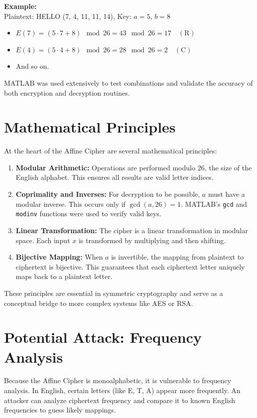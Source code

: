 \documentclass[12pt]{article}
\begin{document}
\textbf{Example:} \\
Plaintext: HELLO (7, 4, 11, 11, 14), Key: \( a = 5 \), \( b = 8 \)
\begin{itemize}
    \item \( E(7) = (5 \cdot 7 + 8) \mod 26 = 43 \mod 26 = 17 \quad (\text{R}) \)
    \item \( E(4) = (5 \cdot 4 + 8) \mod 26 = 28 \mod 26 = 2 \quad (\text{C}) \)
    \item And so on.
\end{itemize}
MATLAB was used extensively to test combinations and validate the accuracy of both encryption and decryption routines.

\section*{Mathematical Principles}
At the heart of the Affine Cipher are several mathematical principles:
\begin{enumerate}
    \item \textbf{Modular Arithmetic:} Operations are performed modulo 26, the size of the English alphabet. This ensures all results are valid letter indices.
    \item \textbf{Coprimality and Inverses:} For decryption to be possible, \( a \) must have a modular inverse. This occurs only if \( \gcd(a, 26) = 1 \). MATLAB's \texttt{gcd} and \texttt{modinv} functions were used to verify valid keys.
    \item \textbf{Linear Transformation:} The cipher is a linear transformation in modular space. Each input \( x \) is transformed by multiplying and then shifting.
    \item \textbf{Bijective Mapping:} When \( a \) is invertible, the mapping from plaintext to ciphertext is bijective. This guarantees that each ciphertext letter uniquely maps back to a plaintext letter.
\end{enumerate}
These principles are essential in symmetric cryptography and serve as a conceptual bridge to more complex systems like AES or RSA.

\section*{Potential Attack: Frequency Analysis}
Because the Affine Cipher is monoalphabetic, it is vulnerable to frequency analysis. In English, certain letters (like E, T, A) appear more frequently. An attacker can analyze ciphertext frequency and compare it to known English frequencies to guess likely mappings.
\end{document}
